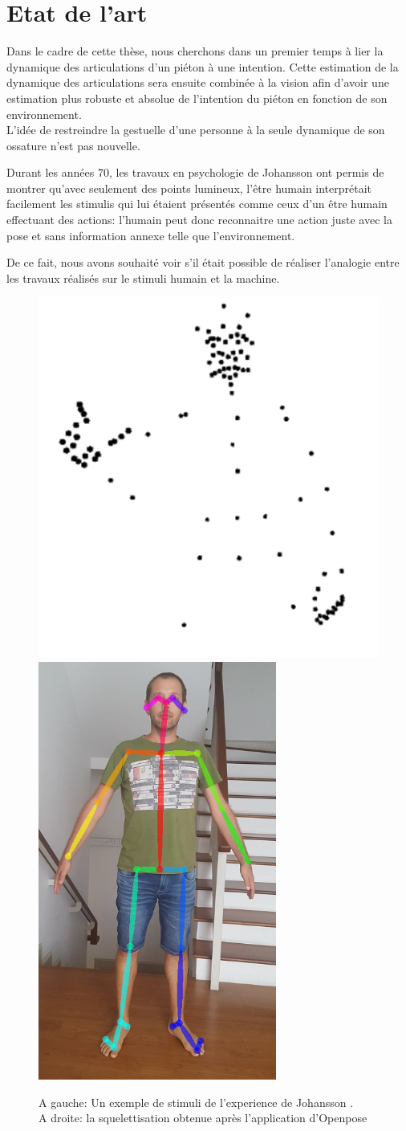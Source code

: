 \chapter{Etat de l'art}
\label{sec:SOTA}

Dans le cadre de cette thèse, nous cherchons dans un premier temps à lier la dynamique des articulations d'un piéton à une intention. Cette estimation de la dynamique des articulations sera ensuite combinée à la vision afin d’avoir une estimation plus robuste et absolue de l'intention du piéton en fonction de son environnement.\\

L'idée de restreindre la gestuelle d'une personne à la seule dynamique de son ossature n'est pas nouvelle.

Durant les années 70, les travaux en psychologie de Johansson  \cite{johansson1973visual,johansson1976spatio} ont permis de montrer qu'avec seulement des points lumineux, l'être humain interprétait facilement les stimulis qui lui étaient présentés comme ceux d'un être humain effectuant des actions: l'humain peut donc reconnaitre une action juste avec la pose et sans information annexe telle que l'environnement. 

De ce fait, nous avons souhaité voir s'il était possible de réaliser l'analogie entre les travaux réalisés sur le stimuli humain et la machine.

\begin{figure}[H]
    \centering
    \includegraphics[width=0.34\linewidth]{Images/Johansson.png}
    \includegraphics[width=0.2\linewidth]{Images/openpose2.png}
    \caption{A gauche: Un exemple de stimuli de l'experience de Johansson \cite{johansson1973visual,johansson1976spatio}.\\ A droite: la squelettisation obtenue après l'application d'Openpose \cite{cao2017realtime}}
    \label{fig:Johansson}
\end{figure}

